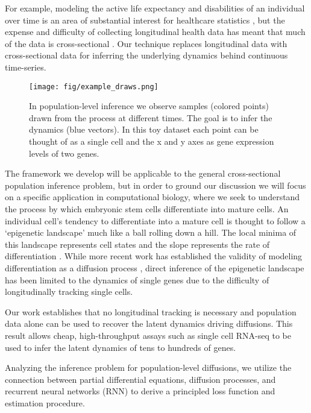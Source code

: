 \documentclass{article}
\begin{document}
For example, modeling the active life expectancy and disabilities of an individual over time is an area of substantial interest for healthcare statistics \citep{manton2008cohort}, but the expense and difficulty of collecting longitudinal health data has meant that much of the data is cross-sectional \citep{robine2004looking}. Our technique replaces longitudinal data with cross-sectional data for inferring the underlying dynamics behind continuous time-series.

\begin{figure}
\vspace{-7pt}
\centering
\texttt{[image: fig/example\_draws.png]}
\vspace{-7pt}
\caption{In population-level inference we observe samples (colored points) drawn from the process at different times. The goal is to infer the dynamics (blue vectors). In this toy dataset each point can be thought of as a single cell and the x and y axes as gene expression levels of two genes.}
\label{fig:problem}
\vspace{-8pt}
\end{figure}


The framework we develop will be applicable to the general cross-sectional population inference problem, but in order to ground our discussion we will focus on a specific application in computational biology, where we seek to understand the process by which embryonic stem cells differentiate into mature cells. An individual cell's tendency to differentiate into a mature cell is thought to follow a `epigenetic landscape' much like a ball rolling down a hill. The local minima of this landscape represents cell states and the slope represents the rate of differentiation \citep{waddington1940organisers}. While more recent work has established the validity of modeling differentiation as a diffusion process \citep{hanna2009direct,morris2014mathematical}, direct inference of the epigenetic landscape has been limited to the dynamics of single genes \citep{sisan2012predicting} due to the difficulty of longitudinally tracking single cells.

Our work establishes that no longitudinal tracking is necessary and population data alone can be used to recover the latent dynamics driving diffusions. This result allows cheap, high-throughput assays such as single cell RNA-seq to be used to infer the latent dynamics of tens to hundreds of genes.

Analyzing the inference problem for population-level diffusions, we utilize the connection between partial differential equations, diffusion processes, and recurrent neural networks (RNN) to derive a principled loss function and estimation procedure.
\end{document}
